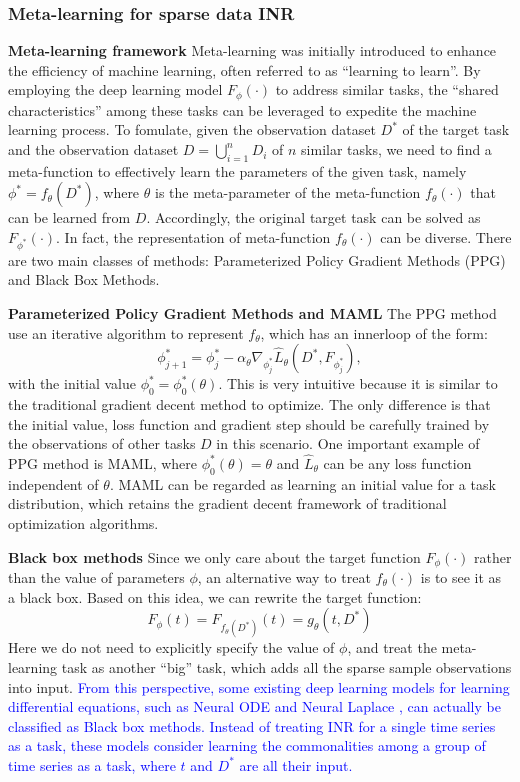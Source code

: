 \documentclass{article}
\begin{document}
\subsubsection{Meta-learning for sparse data INR}

\textbf{Meta-learning framework}
Meta-learning was initially introduced to enhance the efficiency of machine learning, often referred to as ``learning to learn''.
By employing the deep learning model $F_\phi(\cdot)$ to address similar tasks, the ``shared characteristics'' among these tasks can be leveraged to expedite the machine learning process. \cite{raghu2019rapid}
To fomulate, given the observation dataset $D^*$ of the target task and the observation dataset $D=\bigcup_{i=1}^n D_i$ of $n$ similar tasks, we need to find a meta-function to effectively learn the parameters of the given task, namely $\phi^*=f_\theta(D^*)$,
where $\theta$ is the meta-parameter of the meta-function $f_\theta(\cdot)$ that can be learned from $D$. Accordingly, the original target task can be solved as $F_{\phi^*}(\cdot)$.
In fact, the representation of meta-function $f_\theta(\cdot)$ can be diverse. There are two main classes of methods:  Parameterized Policy Gradient Methods (PPG) and Black Box Methods.

\textbf{Parameterized Policy Gradient Methods and MAML}
The PPG method use an iterative algorithm to represent $f_\theta$, which has an innerloop of the form:
$$
\phi^*_{j+1}=\phi_j^*-\alpha_\theta \nabla_{\phi_j^*} \hat{L}_\theta\left(D^*, F_{\phi_j^*}\right),
$$
with the initial value $\phi_0^*=\phi_0^*(\theta)$.
This is very intuitive because it is similar to the traditional gradient decent method to optimize. 
The only difference is that the initial value, loss function and gradient step should be carefully trained by the observations of other tasks $D$ in this scenario.
One important example of PPG method is MAML, where $\phi_0^*(\theta)=\theta$ and $\hat{L}_\theta$ can be any loss function independent of $\theta$.
MAML can be regarded as learning an initial value for a task distribution, which retains the gradient decent framework of traditional optimization algorithms.

\textbf{Black box methods}
Since we only care about the target function $F_\phi(\cdot)$ rather than the value of parameters $\phi$, an alternative way to treat $f_\theta(\cdot)$ is to see it as a black box. Based on this idea, we can rewrite the target function:
$$
F_\phi(t)=F_{f_\theta(D^*)}(t)=g_\theta(t,D^*)
$$
Here we do not need to explicitly specify the value of $\phi$, and treat the meta-learning task as another ``big'' task, which adds all the sparse sample observations into input.
\textcolor{blue}{
  From this perspective, some existing deep learning models for learning differential equations, 
  such as Neural ODE \cite{chen2018neural} and Neural Laplace \cite{holt2022neural}, 
  can actually be classified as Black box methods. 
  Instead of treating INR for a single time series as a task, 
  these models consider learning the commonalities among a group of time series as a task, where $t$ and $D^*$ are all their input.
}
\end{document}
